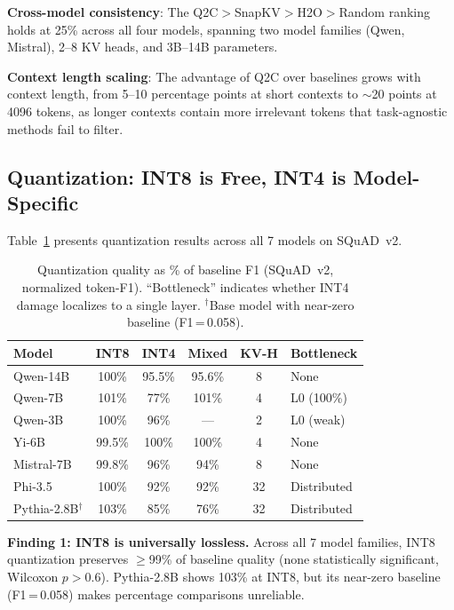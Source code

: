 \documentclass[conference]{IEEEtran}
\newcommand{\QtoC}{\textsc{Q2C}\xspace}
\begin{document}
\textbf{Cross-model consistency}: The Q2C$>$SnapKV$>$H2O$>$Random ranking holds at 25\% across all four models, spanning two model families (Qwen, Mistral), 2--8 KV heads, and 3B--14B parameters.

\textbf{Context length scaling}: The advantage of \QtoC over baselines grows with context length, from 5--10 percentage points at short contexts to $\sim$20 points at 4096 tokens, as longer contexts contain more irrelevant tokens that task-agnostic methods fail to filter.

\subsection{Quantization: INT8 is Free, INT4 is Model-Specific}

Table~\ref{tab:quantization} presents quantization results across all 7 models on SQuAD~v2.

\begin{table}[t]
\centering
\caption{Quantization quality as \% of baseline F1 (SQuAD~v2, normalized token-F1). ``Bottleneck'' indicates whether INT4 damage localizes to a single layer. $^\dagger$Base model with near-zero baseline (F1\,=\,0.058).}
\label{tab:quantization}
\small
\begin{tabular}{@{}lccccl@{}}
\toprule
\textbf{Model} & \textbf{INT8} & \textbf{INT4} & \textbf{Mixed} & \textbf{KV-H} & \textbf{Bottleneck} \\
\midrule
Qwen-14B   & 100\%  & 95.5\% & 95.6\% & 8  & None \\
Qwen-7B    & 101\%  & 77\%   & 101\%  & 4  & L0 (100\%) \\
Qwen-3B    & 100\%  & 96\%   & ---    & 2  & L0 (weak) \\
Yi-6B      & 99.5\% & 100\%  & 100\%  & 4  & None \\
Mistral-7B & 99.8\% & 96\%   & 94\%   & 8  & None \\
Phi-3.5    & 100\%  & 92\%   & 92\%   & 32 & Distributed \\
Pythia-2.8B$^\dagger$ & 103\% & 85\% & 76\% & 32 & Distributed \\
\bottomrule
\end{tabular}
\end{table}

\textbf{Finding 1: INT8 is universally lossless.}
Across all 7 model families, INT8 quantization preserves $\geq$99\% of baseline quality (none statistically significant, Wilcoxon $p > 0.6$).
Pythia-2.8B shows 103\% at INT8, but its near-zero baseline (F1\,=\,0.058) makes percentage comparisons unreliable.
\end{document}

